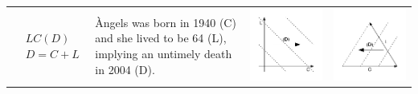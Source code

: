 \documentclass[11pt,oneside,a4paper]{article} %
\begin{document}
\begin{center}
\begin{longtable}{m{}m{}m{}m{}}
  \midrule
  $$\begin{aligned}
    &LC(D) \\
    &D = C + L
  \end{aligned}$$ &
  {\`A}ngels was born in 1940 (C) and she lived to be 64 (L), implying an
  untimely death in 2004 (D). & \includegraphics[width =
  \linewidth]{Figures/JonasTable/LCd.pdf} & \includegraphics[width = \linewidth]{Figures/JonasTable/LCd_iso.pdf}  \\

\end{longtable}
\end{center}
\end{document}
